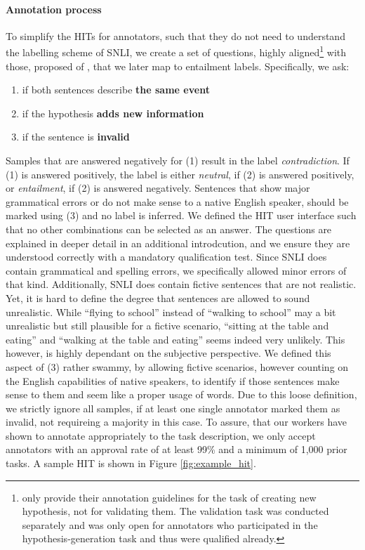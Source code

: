 \paragraph*{Annotation process}
To simplify the \ac{HIT}s for annotators, such that they do not need to understand the labelling scheme of \ac{SNLI}, we create a set of questions, highly aligned\footnote{\cite{bowman2015large} only provide their annotation guidelines for the task of creating new hypothesis, not for validating them. The validation task was conducted separately and was only open for annotators who participated in the hypothesis-generation task and thus were qualified already. } with those, proposed of \cite{bowman2015large}, that we later map to entailment labels. Specifically, we ask:
\begin{enumerate}
\item if both sentences describe \textbf{the same event}
\item if the hypothesis \textbf{adds new information}
\item if the sentence is \textbf{invalid}
\end{enumerate}
Samples that are answered negatively for (1) result in the label \textit{contradiction}. If (1) is answered positively, the label is either \textit{neutral}, if (2) is answered positively, or \textit{entailment}, if (2) is answered negatively. Sentences that show major grammatical errors or do not make sense to a native English speaker, should be marked using (3) and no label is inferred. We defined the \ac{HIT} user interface such that no other combinations can be selected as an answer. The questions are explained in deeper detail in an additional introdcution, and we ensure they are understood correctly with a mandatory qualification test. Since \ac{SNLI} does contain grammatical and spelling errors, we specifically allowed minor errors of that kind. Additionally, \ac{SNLI} does contain fictive sentences that are not realistic. Yet, it is hard to define the degree that sentences are allowed to sound unrealistic. While ``flying to school'' instead of ``walking to school'' may a bit unrealistic but still plausible for a fictive scenario, ``sitting at the table and eating'' and ``walking at the table and eating'' seems indeed very unlikely. This however, is highly dependant on the subjective perspective. We defined this aspect of (3) rather swammy, by allowing fictive scenarios, however counting on the English capabilities of native speakers, to identify if those sentences make sense to them and seem like a proper usage of words. Due to this loose definition, we strictly ignore all samples, if at least one single annotator marked them as invalid, not requireing a majority in this case. To assure, that our workers have shown to annotate appropriately to the task description, we only accept annotators with an approval rate of at least 99\% and a minimum of 1,000 prior tasks. A sample \ac{HIT} is shown in Figure \ref{fig:example_hit}. 
